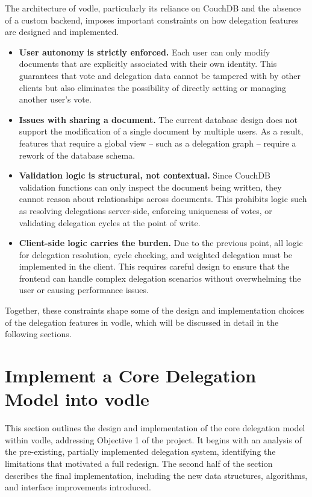 The architecture of vodle, particularly its reliance on CouchDB and the absence of a custom backend, imposes important constraints on how delegation features are designed and implemented.

\begin{itemize}
  \item \textbf{User autonomy is strictly enforced.} Each user can only modify documents that are explicitly associated with their own identity. This guarantees that vote and delegation data cannot be tampered with by other clients but also eliminates the possibility of directly setting or managing another user's vote.

  \item \textbf{Issues with sharing a document.} The current database design does not support the modification of a single document by multiple users. As a result, features that require a global view -- such as a delegation graph -- require a rework of the database schema.

  \item \textbf{Validation logic is structural, not contextual.} Since CouchDB validation functions can only inspect the document being written, they cannot reason about relationships across documents. This prohibits logic such as resolving delegations server-side, enforcing uniqueness of votes, or validating delegation cycles at the point of write.

  \item \textbf{Client-side logic carries the burden.} Due to the previous point, all logic for delegation resolution, cycle checking, and weighted delegation must be implemented in the client. This requires careful design to ensure that the frontend can handle complex delegation scenarios without overwhelming the user or causing performance issues.
\end{itemize}

Together, these constraints shape some of the design and implementation choices of the delegation features in vodle, which will be discussed in detail in the following sections.

\section{Implement a Core Delegation Model into vodle}\label{sec:core_delegation_detailed}
This section outlines the design and implementation of the core delegation model within vodle, addressing Objective 1 of the project. It begins with an analysis of the pre-existing, partially implemented delegation system, identifying the limitations that motivated a full redesign. The second half of the section describes the final implementation, including the new data structures, algorithms, and interface improvements introduced.

